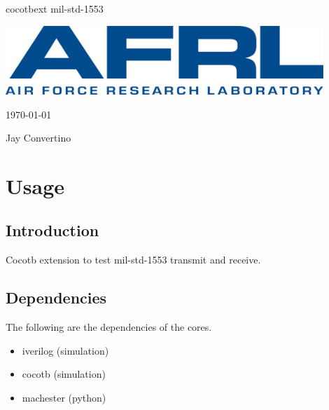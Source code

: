 \begin{titlepage}
  \begin{center}

  {\Huge cocotbext mil-std-1553}

  \vspace{25mm}

  \includegraphics[width=0.90\textwidth,height=\textheight,keepaspectratio]{img/AFRL.png}

  \vspace{25mm}

  \today

  \vspace{15mm}

  {\Large Jay Convertino}

  \end{center}
\end{titlepage}

\tableofcontents

\newpage

\section{Usage}

\subsection{Introduction}

\par
Cocotb extension to test mil-std-1553 transmit and receive.

\subsection{Dependencies}

\par
The following are the dependencies of the cores.

\begin{itemize}
  \item iverilog (simulation)
  \item cocotb (simulation)
  \item machester (python)
\end{itemize}

